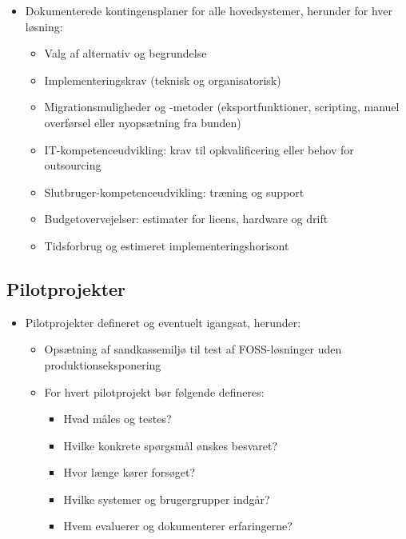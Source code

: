 \documentclass[a4paper,11pt,oneside]{book}
\def\tightlist{}
\begin{document}
\begin{itemize}
\item
  Dokumenterede kontingensplaner for alle hovedsystemer, herunder for
  hver løsning:

  \begin{itemize}
  \tightlist
  \item
    Valg af alternativ og begrundelse
  \item
    Implementeringskrav (teknisk og organisatorisk)
  \item
    Migrationsmuligheder og -metoder (eksportfunktioner, scripting,
    manuel overførsel eller nyopsætning fra bunden)
  \item
    IT-kompetenceudvikling: krav til opkvalificering eller behov for
    outsourcing
  \item
    Slutbruger-kompetenceudvikling: træning og support
  \item
    Budgetovervejelser: estimater for licens, hardware og drift
  \item
    Tidsforbrug og estimeret implementeringshorisont
  \end{itemize}
\end{itemize}

\subsection{Pilotprojekter}\label{pilotprojekter}

\begin{itemize}
\item
  Pilotprojekter defineret og eventuelt igangsat, herunder:

  \begin{itemize}
  \item
    Opsætning af sandkassemiljø til test af FOSS-løsninger uden
    produktionseksponering
  \item
    For hvert pilotprojekt bør følgende defineres:

    \begin{itemize}
    \tightlist
    \item
      Hvad måles og testes?
    \item
      Hvilke konkrete spørgsmål ønskes besvaret?
    \item
      Hvor længe kører forsøget?
    \item
      Hvilke systemer og brugergrupper indgår?
    \item
      Hvem evaluerer og dokumenterer erfaringerne?
    \end{itemize}
  \end{itemize}
\end{itemize}
\end{document}
